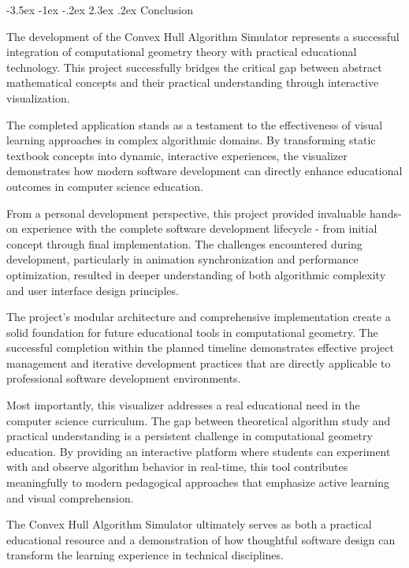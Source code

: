 \documentclass[12pt,a4paper]{article}
\makeatletter
\renewcommand{\section}{\@startsection{section}{1}{\z@}%
  {-3.5ex \@plus -1ex \@minus -.2ex}%
  {2.3ex \@plus.2ex}%
  {\needspace{4\baselineskip}\normalfont\Large\bfseries}}
\makeatother
\begin{document}
\section{Conclusion}

The development of the Convex Hull Algorithm Simulator represents a successful integration of computational geometry theory with practical educational technology. This project successfully bridges the critical gap between abstract mathematical concepts and their practical understanding through interactive visualization.

The completed application stands as a testament to the effectiveness of visual learning approaches in complex algorithmic domains. By transforming static textbook concepts into dynamic, interactive experiences, the visualizer demonstrates how modern software development can directly enhance educational outcomes in computer science education.

From a personal development perspective, this project provided invaluable hands-on experience with the complete software development lifecycle - from initial concept through final implementation. The challenges encountered during development, particularly in animation synchronization and performance optimization, resulted in deeper understanding of both algorithmic complexity and user interface design principles.

The project's modular architecture and comprehensive implementation create a solid foundation for future educational tools in computational geometry. The successful completion within the planned timeline demonstrates effective project management and iterative development practices that are directly applicable to professional software development environments.

Most importantly, this visualizer addresses a real educational need in the computer science curriculum. The gap between theoretical algorithm study and practical understanding is a persistent challenge in computational geometry education. By providing an interactive platform where students can experiment with and observe algorithm behavior in real-time, this tool contributes meaningfully to modern pedagogical approaches that emphasize active learning and visual comprehension.

The Convex Hull Algorithm Simulator ultimately serves as both a practical educational resource and a demonstration of how thoughtful software design can transform the learning experience in technical disciplines.
\end{document}
